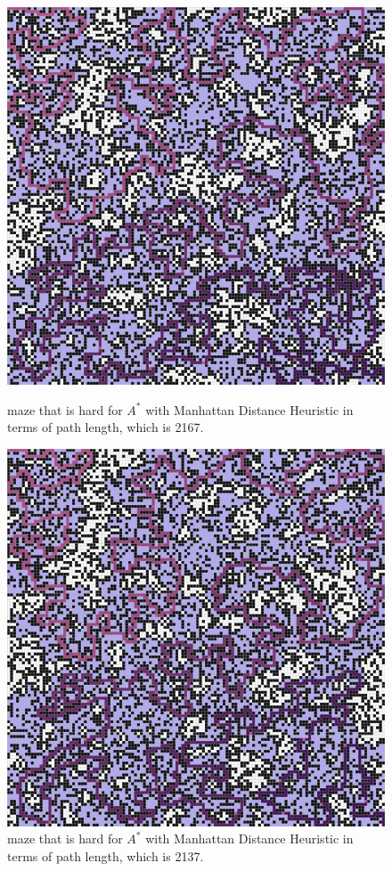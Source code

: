\documentclass[letter]{article}
\begin{document}
\begin{enumerate}[resume]
\begin{enumerate}
\begin{enumerate}
\begin{figure}
					\includegraphics[width=\textwidth]{../pics/amp/2167.png}
					\caption{\label{fig:amp2}maze that is hard for $ A^* $ with Manhattan Distance Heuristic in terms of path length, which is 2167.}
					\endminipage\hfill
					\includegraphics[width=\textwidth]{../pics/amp/2137.png}
					\caption{\label{fig:amp3}maze that is hard for $ A^* $ with Manhattan Distance Heuristic in terms of path length, which is 2137.}
					\endminipage
					\endminipage
					

\end{figure}
\end{enumerate}
\end{enumerate}
\end{enumerate}
\end{document}
